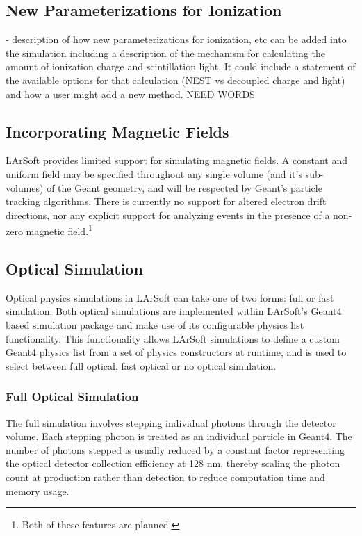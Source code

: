 \documentclass[12pt]{elsarticle}
\begin{document}
\subsection{New Parameterizations for Ionization}
\label{sec:ionization}
- description of how new parameterizations for ionization, etc can be added into the simulation including a description of the mechanism for calculating the amount of ionization charge and scintillation light.  It could include a statement of the available options for that calculation (NEST vs decoupled charge and light) and how a user might add a new method.
NEED WORDS

\subsection{Incorporating Magnetic Fields}
LArSoft provides limited support for simulating magnetic
fields. A constant and uniform field may be specified
throughout any single volume (and it's sub-volumes) of the Geant
geometry, and will be respected by Geant's particle tracking
algorithms. There is currently no support for altered electron
drift directions, nor any explicit support for analyzing events
in the presence of a non-zero magnetic field.\footnote{Both of these features are planned.}

\subsection{Optical Simulation}
Optical physics simulations in LArSoft can take one of two forms: full or fast simulation.  Both optical simulations are implemented within LArSoft's Geant4 based simulation package and make use of its configurable physics list functionality.  This functionality allows LArSoft simulations to define a custom Geant4 physics list from a set of physics constructors at runtime, and is used to select between full optical, fast optical or no optical simulation. 

\subsubsection{Full Optical Simulation}
The full simulation involves stepping individual photons through the detector volume.  Each stepping photon is treated as an individual particle in Geant4.  The number of photons stepped is usually reduced by a constant factor representing the optical detector collection efficiency at 128 nm, thereby scaling the photon count at production rather than detection to reduce computation time and memory usage. 
\end{document}
